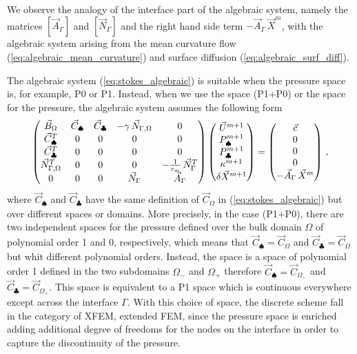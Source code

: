 We observe the analogy of the interface part of the algebraic system,
namely the matrices $[\vec{A}_\Gamma]$ and $[\vec{N}_\Gamma]$ and the right
hand side term $-\vec{A}_\Gamma\,\vec X^m$, with the algebraic system arising
from the mean curvature flow (\ref{eq:algebraic_mean_curvature}) and surface
diffusion (\ref{eq:algebraic_surf_diff}).

The algebraic system (\ref{eq:stokes_algebraic}) is suitable when the pressure
space is, for example, P0 or P1. Instead, when we use the space (P1+P0) or the
space \pdg for the pressure, the algebraic system assumes the following form
\begin{equation}
\begin{pmatrix}
\vec B_\Omega & \vec C_{\spadesuit} & \vec C_{\clubsuit} & -\gamma\,\vec{N}_{\Gamma,\Omega} & 0\\
\vec C^T_{\spadesuit} & 0 & 0 & 0 & 0 \\
\vec C^T_{\clubsuit} & 0 & 0 & 0 & 0 \\
\vec{N}_{\Gamma,\Omega}^T & 0 & 0 & 0 & -\frac1{\tau_m}\,\vec{N}_\Gamma^T \\
0 & 0 & 0 & \vec{N}_\Gamma & \vec{A}_\Gamma
\end{pmatrix}
\begin{pmatrix}
\vec U^{m+1} \\
P^{m+1}_\spadesuit \\
P^{m+1}_\clubsuit \\
\kappa^{m+1} \\
\delta\vec{X}^{m+1}
\end{pmatrix}
=
\begin{pmatrix}
\vec c \\
0 \\
0 \\
0 \\
-\vec{A}_\Gamma\,\vec{X}^{m}
\end{pmatrix} \,,
\label{eq:stokes_algebraic_extended}
\end{equation}
where $\vec C_{\spadesuit}$ and $\vec C_{\clubsuit}$ have the same definition
of $\vec C_\Omega$ in (\ref{eq:stokes_algebraic}) but over different spaces or
domains. More precisely, in the case (P1+P0), there are two independent spaces
for the pressure defined over the bulk domain $\Omega$ of polynomial order 1 and
0, respectively, which means that $\vec C_{\spadesuit}=\vec C_\Omega$ and
$\vec C_{\clubsuit}=\vec C_\Omega$ but whit different polynomial orders.
Instead, the space \pdg is a space of polynomial order 1 defined in the two
subdomains $\Omega_-$ and $\Omega_+$ therefore $\vec C_{\spadesuit}=\vec
C_{\Omega_-}$ and $\vec C_{\clubsuit}=\vec C_{\Omega_+}$. This space is
equivalent to a P1 space which is continuous everywhere except across the
interface $\Gamma$. With this choice of space, the discrete scheme fall in
the category of XFEM, extended FEM, since the pressure space is enriched adding
additional degree of freedoms for the nodes on the interface in order to
capture the discontinuity of the pressure.

